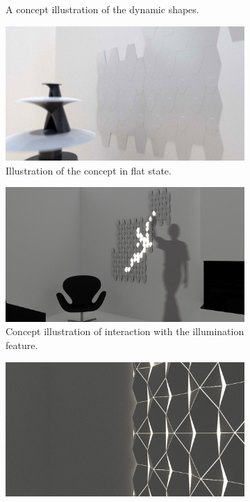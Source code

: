 \begin{figure}[ht]
\begin{subfigure}{.45\textwidth}
		\caption{A concept illustration of the dynamic shapes.}
		\label{fig:beomotion:concept}
	\end{subfigure}%
	\hspace{0.1cm}
	\begin{subfigure}{.45\textwidth}
		\centering
		\includegraphics[width=\linewidth]{figures/beomotion/concept_flat}
		\caption{Illustration of the concept in flat state.}
		\label{fig:beomotion:concept_flat}
	\end{subfigure}
	\begin{subfigure}{.45\textwidth}
		\centering
		\includegraphics[width=\linewidth]{figures/beomotion/concept_lighting}
		\caption{Concept illustration of interaction with the illumination feature.}
		\label{fig:beomotion:concept_light}
	\end{subfigure}%
	\hspace{0.1cm}
	\begin{subfigure}{.45\textwidth}
		\centering
		\includegraphics[width=\linewidth]{figures/beomotion/concept_backlight}

\end{subfigure}
\end{figure}
